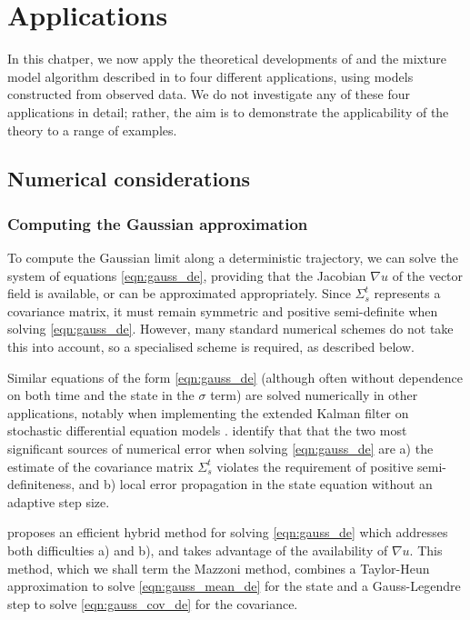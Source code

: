 \chapter{Applications}\label{ch:appls}



In this chatper, we now apply the theoretical developments of  and the mixture model algorithm described in  to four different applications, using models constructed from observed data.
We do not investigate any of these four applications in detail; rather, the aim is to demonstrate the applicability of the theory to a range of examples.



\section{Numerical considerations}



\subsection{Computing the Gaussian approximation}

To compute the Gaussian limit along a deterministic trajectory, we can solve the system of equations \eqref{eqn:gauss_de}, providing that the Jacobian \(\nabla u\) of the vector field is available, or can be approximated appropriately.
Since \(\Sigma_s^t\) represents a covariance matrix, it must remain symmetric and positive semi-definite when solving \eqref{eqn:gauss_de}.
However, many standard numerical schemes do not take this into account, so a specialised scheme is required, as described below.

Similar equations of the form \eqref{eqn:gauss_de} (although often without dependence on both time and the state in the \(\sigma\) term) are solved numerically in other applications, notably when implementing the extended Kalman filter on stochastic differential equation models \citep{Jazwinski_2014_StochasticProcessesFiltering, KulikovaKulikov_2014_AdaptiveODESolvers}.
\citet{KulikovaKulikov_2014_AdaptiveODESolvers} identify that that the two most significant sources of numerical error when solving \eqref{eqn:gauss_de} are a) the estimate of the covariance matrix \(\Sigma_s^t\) violates the requirement of positive semi-definiteness, and b) local error propagation in the state equation without an adaptive step size.

\citet{Mazzoni_2008_ComputationalAspectsContinuous} proposes an efficient hybrid method for solving \eqref{eqn:gauss_de} which addresses both difficulties a) and b), and takes advantage of the availability of \(\nabla u\).
This method, which we shall term the Mazzoni method, combines a Taylor-Heun approximation to solve \eqref{eqn:gauss_mean_de} for the state and a Gauss-Legendre step to solve \eqref{eqn:gauss_cov_de} for the covariance.



